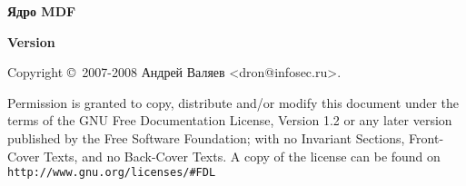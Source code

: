 \documentclass[draft]{article}
\makeatletter
\def\author{Андрей Валяев <dron@infosec.ru>}
\def\title{Ядро MDF}
\def\version{Version }
\makeatother
\begin{document}
\hbox{}\vfill
\centerline{\textbf{\Huge\title}}
\centerline{\textbf{\Large\version}}
\vfill

Copyright \copyright\  2007-2008 \author.

{\small Permission is granted to copy, distribute and/or modify this document under the terms of the GNU Free Documentation License, Version 1.2 or any later version published by the Free Software Foundation; with no Invariant Sections, Front-Cover Texts, and no Back-Cover Texts. A copy of the license can be found on \texttt{http://www.gnu.org/licenses/\#FDL}}

\newpage
\tableofcontents

\newpage
\parskip 3mm






\end{document}
